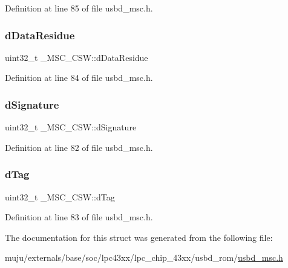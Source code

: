 Definition at line 85 of file usbd\+\_\+msc.\+h.

\mbox{\label{struct___m_s_c___c_s_w_a58a9d983a1e1707b9a99ad1a61acae72}} 
\subsubsection{\texorpdfstring{d\+Data\+Residue}{dDataResidue}}
{\footnotesize\ttfamily uint32\+\_\+t \+\_\+\+M\+S\+C\+\_\+\+C\+S\+W\+::d\+Data\+Residue}



Definition at line 84 of file usbd\+\_\+msc.\+h.

\mbox{\label{struct___m_s_c___c_s_w_ab5e9fc6fcc75f4b6e5ca7aada1443913}} 
\subsubsection{\texorpdfstring{d\+Signature}{dSignature}}
{\footnotesize\ttfamily uint32\+\_\+t \+\_\+\+M\+S\+C\+\_\+\+C\+S\+W\+::d\+Signature}



Definition at line 82 of file usbd\+\_\+msc.\+h.

\mbox{\label{struct___m_s_c___c_s_w_a6b340e8049b2f6b06d3747b42db1ebac}} 
\subsubsection{\texorpdfstring{d\+Tag}{dTag}}
{\footnotesize\ttfamily uint32\+\_\+t \+\_\+\+M\+S\+C\+\_\+\+C\+S\+W\+::d\+Tag}



Definition at line 83 of file usbd\+\_\+msc.\+h.



The documentation for this struct was generated from the following file\+:\begin{DoxyCompactItemize}
\item 
muju/externals/base/soc/lpc43xx/lpc\+\_\+chip\+\_\+43xx/usbd\+\_\+rom/\hyperlink{usbd__msc_8h}{usbd\+\_\+msc.\+h}\end{DoxyCompactItemize}
